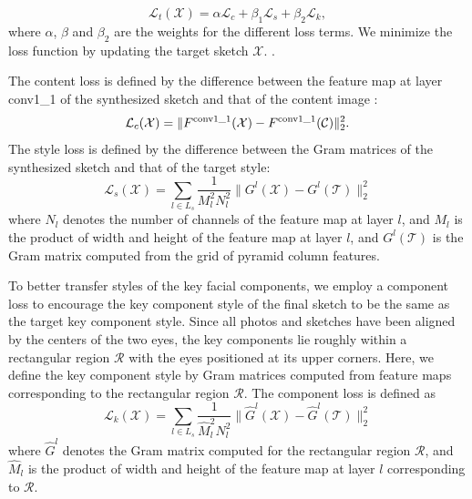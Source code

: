 \documentclass[10pt,twocolumn,letterpaper]{article}
\def\redn[#1]{\textcolor{red}{}}
\begin{document}
\begin{equation}
\mathcal{L}_{t}( \mathcal{X} ) = \alpha \mathcal{L}_{c} + \beta_1 \mathcal{L}_{s} + \beta_2 \mathcal{L}_{k},
\label{eq:Total_loss}
\end{equation}
where $\alpha$, $\beta$ and $\beta_2$ are the weights for the different loss terms.
We minimize the loss function by updating the target sketch $\mathcal{X}$. \redn[without changing the VGG parameters(?)].

The content loss is defined by the difference between the feature map at layer conv1\_1 of the synthesized sketch and that of the content image :
\begin{equation}
\mathcal{L}_{c}( \mathcal{X} ) = \| {{F^{\rm{conv1\_1}}}( \mathcal{X} ) - {F^{\rm{conv1\_1}}}( \mathcal{C} )} \|_2^2.
\label{eq:content_loss}
\end{equation}
The style loss is defined by the difference between the Gram matrices of the synthesized sketch and that of the target style:
\begin{equation}
\mathcal{L}_{s} ( \mathcal{X} ) = \sum\limits_{l \in {L_s}} {\frac{1}{{M_l^2N_l^2}}\| {{G^l}(\mathcal{X} ) - G^l(\mathcal{T})} \|_2^2} 
\label{eq:Gram_loss}
\end{equation}
where $N_l$ denotes the number of channels of the feature map at layer $l$, and $M_l$ is the product of width and height of the feature map at layer $l$, and $G^l(\mathcal{T})$ is the Gram matrix computed from the grid of pyramid column features.  

To better transfer styles of the key facial components, we employ a component loss to encourage the key component style of the final sketch to be the same as the target key component style. Since all photos and sketches have been aligned by the centers of the two eyes, the key components lie roughly within a rectangular region $\mathcal{R}$ with the eyes positioned at its upper corners. Here, we define the key component style by Gram matrices computed from feature maps corresponding to  the rectangular region $\mathcal{R}$. The component loss is defined as
\begin{equation}
\mathcal{L}_{k} ( \mathcal{X} ) = \sum\limits_{l \in {L_s}} {\frac{1}{{\hat{M}_l^2{N}_l^2}}\| {{{\hat G}^l}( \mathcal{X} ) - {\hat G}^l(\mathcal{T})} \|_2^2} 
\label{eq:component_loss}
\end{equation}
where $\hat G^l$ denotes the Gram matrix computed for the rectangular region $\mathcal R$, and $\hat{M}_l$ is the product of width and height of the feature map at layer $l$ corresponding to $\mathcal R$. 
\end{document}
